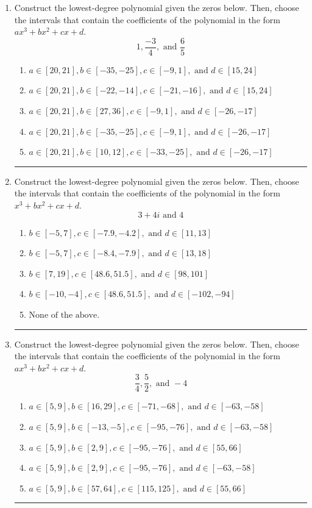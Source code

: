 \documentclass[14pt]{extbook}
\newcommand{\litem}[1]{\item#1\hspace*{-1cm}\rule{\textwidth}{0.4pt}}
\begin{document}
\begin{enumerate}
\litem{
Construct the lowest-degree polynomial given the zeros below. Then, choose the intervals that contain the coefficients of the polynomial in the form $ax^3+bx^2+cx+d$.\[ 1, \frac{-3}{4}, \text{ and } \frac{6}{5} \]\begin{enumerate}[label=\Alph*.]
\item \( a \in [20, 21], b \in [-35, -25], c \in [-9, 1], \text{ and } d \in [15, 24] \)
\item \( a \in [20, 21], b \in [-22, -14], c \in [-21, -16], \text{ and } d \in [15, 24] \)
\item \( a \in [20, 21], b \in [27, 36], c \in [-9, 1], \text{ and } d \in [-26, -17] \)
\item \( a \in [20, 21], b \in [-35, -25], c \in [-9, 1], \text{ and } d \in [-26, -17] \)
\item \( a \in [20, 21], b \in [10, 12], c \in [-33, -25], \text{ and } d \in [-26, -17] \)

\end{enumerate} }
\litem{
Construct the lowest-degree polynomial given the zeros below. Then, choose the intervals that contain the coefficients of the polynomial in the form $x^3+bx^2+cx+d$.\[ 3 + 4 i \text{ and } 4 \]\begin{enumerate}[label=\Alph*.]
\item \( b \in [-5, 7], c \in [-7.9, -4.2], \text{ and } d \in [11, 13] \)
\item \( b \in [-5, 7], c \in [-8.4, -7.9], \text{ and } d \in [13, 18] \)
\item \( b \in [7, 19], c \in [48.6, 51.5], \text{ and } d \in [98, 101] \)
\item \( b \in [-10, -4], c \in [48.6, 51.5], \text{ and } d \in [-102, -94] \)
\item \( \text{None of the above.} \)

\end{enumerate} }
\litem{
Construct the lowest-degree polynomial given the zeros below. Then, choose the intervals that contain the coefficients of the polynomial in the form $ax^3+bx^2+cx+d$.\[ \frac{3}{4}, \frac{5}{2}, \text{ and } -4 \]\begin{enumerate}[label=\Alph*.]
\item \( a \in [5, 9], b \in [16, 29], c \in [-71, -68], \text{ and } d \in [-63, -58] \)
\item \( a \in [5, 9], b \in [-13, -5], c \in [-95, -76], \text{ and } d \in [-63, -58] \)
\item \( a \in [5, 9], b \in [2, 9], c \in [-95, -76], \text{ and } d \in [55, 66] \)
\item \( a \in [5, 9], b \in [2, 9], c \in [-95, -76], \text{ and } d \in [-63, -58] \)
\item \( a \in [5, 9], b \in [57, 64], c \in [115, 125], \text{ and } d \in [55, 66] \)

\end{enumerate} }
\end{enumerate}
\end{document}
